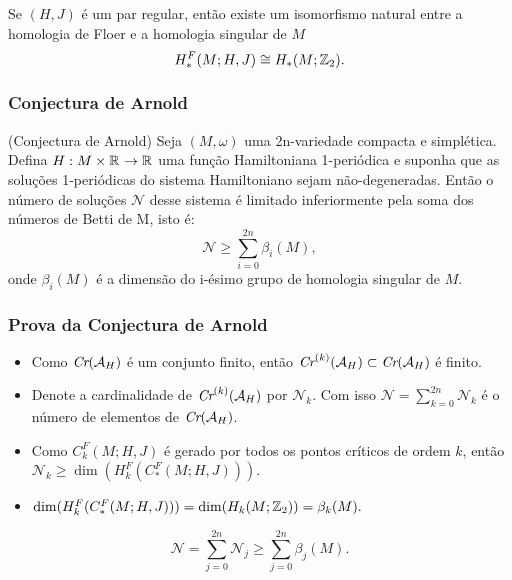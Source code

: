 \documentclass{beamer}
\begin{document}
\begin{footnotesize}
\begin{frame}
			\begin{teorema}\label{teorema_isomorfismo_homologia_floer}
				Se $(H,J)$ é um par regular, então 
				existe um isomorfismo natural entre a homologia de Floer e a homologia singular de $M$
				$$
				H^{F}_{*}(M;H,J) \cong H_{*}(M;\mathbb{Z}_{2}). 
				$$
				
			\end{teorema}
			
	\end{frame}
	
	\begin{frame}
		\frametitle{Conjectura de Arnold}
		
			\begin{teorema}
				(Conjectura de Arnold) Seja $(M,\omega)$ uma 2n-variedade compacta e simplética. Defina $H:M\times \mathbb{R}^{} \to \mathbb{R}^{}$ uma função Hamiltoniana 1-periódica e suponha que as soluções 1-periódicas do sistema Hamiltoniano sejam não-degeneradas. Então o número de soluções $\mathcal{N}$ desse sistema é limitado inferiormente pela soma dos números de Betti de M, isto é:
				$$
				\mathcal{N}\geq \sum_{i=0}^{2n}\beta_{i}(M),
				$$
				onde $\beta_{i}(M)$ é a dimensão do i-ésimo grupo de homologia singular de $M$.
			\end{teorema}
	\end{frame}
	
	
	\begin{frame}
		\frametitle{Prova da Conjectura de Arnold}
			
			\begin{prova}
				\begin{itemize}
					\item Como $\textit{Cr}(\mathcal{A}_{H})$ é um conjunto finito, então $\textit{Cr}^{(k)}(\mathcal{A}_{H}) \subset \textit{Cr}(\mathcal{A}_{H})$ é finito.
					
					\item Denote a cardinalidade de $\textit{Cr}^{(k)}(\mathcal{A}_{H})$ por $\mathcal{N}_{k}$. Com isso $\mathcal{N} =\sum_{k=0}^{2n} \mathcal{N}_{k}$ é o número de elementos de $\textit{Cr}(\mathcal{A}_{H})$.
					
					\item  Como $C^{F}_{k}(M;H,J)$ é gerado por todos os pontos críticos de ordem $k$, então $\mathcal{N}_{k}\geq \dim(	H^{F}_{k}(C^{F}_{*}(M;H,J)))$. 
					
					\item $\dim(	H^{F}_{k}(C^{F}_{*}(M;H,J)))  = \dim(	H_{k}(M;\mathbb{Z}_{2})) = \beta_{k}(M).$
				\end{itemize} 
				$$
				\mathcal{N} =\sum_{j=0}^{2n} \mathcal{N}_{j} \geq \sum_{j=0}^{2n} \beta_{j}(M).
				$$
				
			\end{prova}
			
	\end{frame}

\end{footnotesize}	
\end{document}
